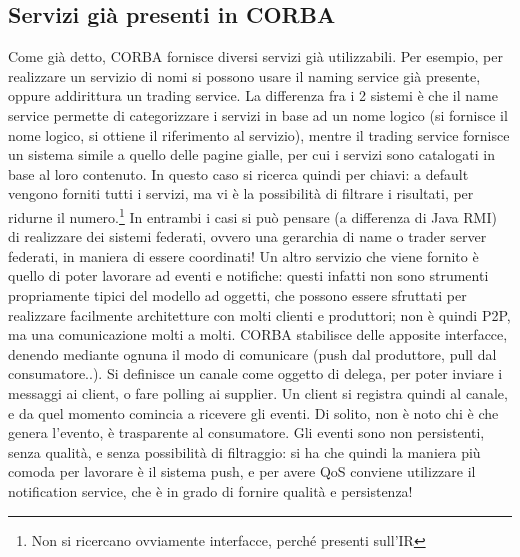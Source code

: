 \subsection{Servizi già presenti in CORBA}
Come già detto, CORBA fornisce diversi servizi già utilizzabili.
Per esempio, per realizzare un servizio di nomi si possono usare il naming service già presente, oppure addirittura un
trading service. La differenza fra i 2 sistemi è che il name service permette di categorizzare i servizi in base ad
un nome logico (si fornisce il nome logico, si ottiene il riferimento al servizio), mentre il trading service fornisce
un sistema simile a quello delle pagine gialle, per cui i servizi sono catalogati in base al loro contenuto. In questo
caso si ricerca quindi per chiavi: a default vengono forniti tutti i servizi, ma vi è la possibilità di filtrare i
risultati, per ridurne il numero.\footnote{Non si ricercano ovviamente interfacce, perché presenti sull'IR}
In entrambi i casi si può pensare (a differenza di Java RMI) di realizzare dei sistemi federati, ovvero una gerarchia di
name o trader server federati, in maniera di essere coordinati!
Un altro servizio che viene fornito è quello di poter lavorare ad eventi e notifiche: questi infatti non sono strumenti
propriamente tipici del modello ad oggetti, che possono essere sfruttati per realizzare facilmente architetture con
molti clienti e produttori; non è quindi P2P, ma una comunicazione molti a molti.
CORBA stabilisce delle apposite interfacce, denendo mediante ognuna il modo di comunicare (push dal produttore, pull dal
consumatore..). Si definisce un canale come oggetto di delega, per poter inviare i messaggi ai client, o fare polling ai
supplier. Un client si registra quindi al canale, e da quel momento comincia a ricevere gli eventi.
Di solito, non è noto chi è che genera l'evento, è trasparente al consumatore.
Gli eventi sono non persistenti, senza qualità, e senza possibilità di filtraggio: si ha che quindi la maniera più
comoda per lavorare è il sistema push, e per avere QoS conviene utilizzare il notification service, che è in grado di
fornire qualità e persistenza!
